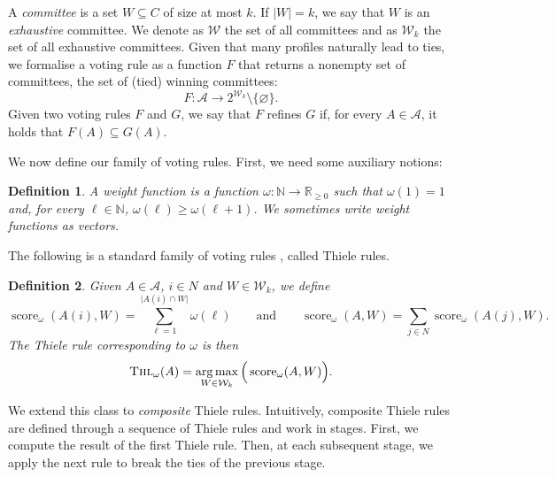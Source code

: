 \documentclass[11pt,a4paper]{article}
\newcommand{\voters}{N}
\newcommand{\candidates}{C}
\newcommand{\approfile}{A}
\newcommand{\app}[1]{A(#1)}
\newcommand{\profiles}{\mathcal A}
\newcommand{\committee}{W}
\newcommand{\committees}{\mathcal W}
\newcommand{\kcommittees}{\mathcal W_k}
\newcommand{\weight}{\omega}
\newcommand{\num}{\ell}
\newcommand{\nats}{\mathbb N}
\newcommand{\nonNegReals}{\mathbb R_{\ge0}}
\newcommand{\Thiele}{\textnormal{\textsc{Thl}}}
\newcommand{\score}{\operatorname{score}}
\newcommand{\powerset}[1]{2^{#1}}
\DeclareMathOperator*{\argmax}{arg\,max}
\newtheorem{definition}{Definition}
\begin{document}
A \emph{committee} is a set $\committee\subseteq\candidates$ of size at most
$k$. If $|\committee|=k$, we say that $\committee$ is an \emph{exhaustive}
committee. We denote as $\committees$ the set of all committees and as
$\kcommittees$ the set of all exhaustive committees. Given that many profiles
naturally lead to ties, we formalise a voting rule as a function $F$ that returns
a nonempty set of committees, the set of (tied) winning committees:
\[F:\profiles\rightarrow\powerset{\kcommittees}\setminus\{\varnothing\}.\]
Given two voting rules $F$ and $G$, we say that $F$ refines $G$ if, for every
$\approfile\in\profiles$, it holds that $F(\approfile)\subseteq G(\approfile)$.

We now define our family of voting rules. First, we need some auxiliary notions:

\begin{definition}\label{def:weight-functions}
	A \emph{weight function} is a function
  $\weight\colon\nats\rightarrow\nonNegReals$ such that $\weight(1)=1$ and, for
  every $\num\in\nats$, $\weight(\num)\geq \weight(\num+1)$. We sometimes write
  weight functions as vectors.
\end{definition}

The following is a standard family of voting rules \cite{abcbook}, called Thiele rules.

\begin{definition}\label{def:Thiele}
  Given $\approfile\in\profiles$, $i\in\voters$ and
  $\committee\in\kcommittees$, we define
  \[
    \score_{\weight}(\app{i}, \committee) = \sum_{\num=1}^{\lvert\app{i}\cap
    \committee\rvert}\weight(\num)\quad\quad\text{and}\quad\quad\score_{\weight}(\approfile,
    \committee)=\sum_{j\in \voters}\score_{\weight}(\app{j}, \committee).
  \]
  The \emph{Thiele rule} corresponding
  to $\weight$ is then
  \[
    \Thiele_\weight(\approfile) =
    \argmax_{\committee\in\kcommittees}\Big(\score_{\weight}(\approfile,\committee)\Big).
  \]
\end{definition}

We extend this class to \emph{composite} Thiele rules.
Intuitively, composite Thiele rules are defined through a sequence of Thiele
rules and work in stages. First, we compute the result of the first Thiele rule.
Then, at each subsequent stage, we apply the next rule to break the ties of
the previous stage.
\end{document}

